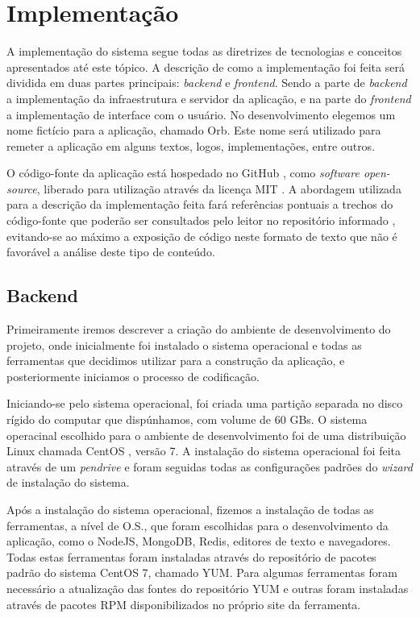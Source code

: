 \chapter{Implementação}
A implementação do sistema segue todas as diretrizes de tecnologias e conceitos apresentados até este tópico. A descrição de como a implementação foi feita será dividida em duas partes principais: \textit{backend} e \textit{frontend}. Sendo a parte de \textit{backend} a implementação da infraestrutura e servidor da aplicação, e na parte do \textit{frontend} a implementação de interface com o usuário. No desenvolvimento elegemos um nome fictício para a aplicação, chamado Orb. Este nome será utilizado para remeter a aplicação em alguns textos, logos, implementações, entre outros.

O código-fonte da aplicação está hospedado no GitHub \cite{orb}, como \textit{software open-source}, liberado para utilização através da licença MIT \cite{mit}. A abordagem utilizada para a descrição da implementação feita fará referências pontuais a trechos do código-fonte que poderão ser consultados pelo leitor no repositório informado \cite{orb}, evitando-se ao máximo a exposição de código neste formato de texto que não é favorável a análise deste tipo de conteúdo.

\section{Backend}
Primeiramente iremos descrever a criação do ambiente de desenvolvimento do projeto, onde inicialmente foi instalado o sistema operacional e todas as ferramentas que decidimos utilizar para a construção da aplicação, e posteriormente iniciamos o processo de codificação.

Iniciando-se pelo sistema operacional, foi criada uma partição separada no disco rígido do computar que dispúnhamos, com volume de 60 GBs. O sistema operacinal escolhido para o ambiente de desenvolvimento foi de uma distribuição Linux chamada CentOS \cite{centos}, versão 7. A instalação do sistema operacional foi feita através de um \textit{pendrive} e foram seguidas todas as configurações padrões do \textit{wizard} de instalação do sistema.

Após a instalação do sistema operacional, fizemos a instalação de todas as ferramentas, a nível de O.S., que foram escolhidas para o desenvolvimento da aplicação, como o NodeJS, MongoDB, Redis, editores de texto e navegadores. Todas estas ferramentas foram instaladas através do repositório de pacotes padrão do sistema CentOS 7, chamado YUM. Para algumas ferramentas foram necessário a atualização das fontes do repositório YUM e outras foram instaladas através de pacotes RPM disponibilizados no próprio site da ferramenta.

